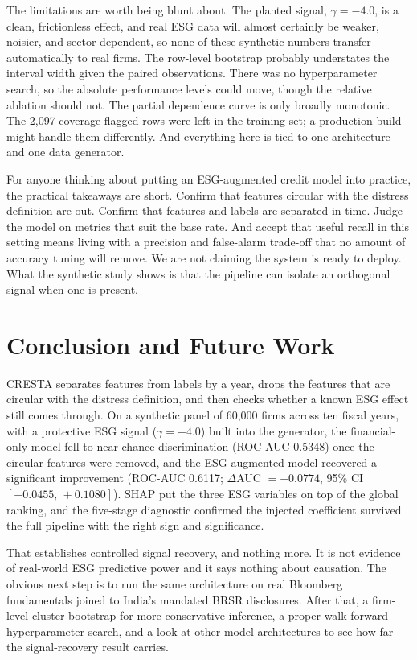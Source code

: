 \documentclass[conference]{IEEEtran}
\begin{document}
The limitations are worth being blunt about. The planted signal, $\gamma = -4.0$,
is a clean, frictionless effect, and real ESG data will almost certainly be
weaker, noisier, and sector-dependent, so none of these synthetic numbers
transfer automatically to real firms. The row-level bootstrap probably
understates the interval width given the paired observations. There was no
hyperparameter search, so the absolute performance levels could move, though the
relative ablation should not. The partial dependence curve is only broadly
monotonic. The 2{,}097 coverage-flagged rows were left in the training set; a
production build might handle them differently. And everything here is tied to
one architecture and one data generator.

For anyone thinking about putting an ESG-augmented credit model into practice,
the practical takeaways are short. Confirm that features circular with the
distress definition are out. Confirm that features and labels are separated in
time. Judge the model on metrics that suit the base rate. And accept that useful
recall in this setting means living with a precision and false-alarm trade-off
that no amount of accuracy tuning will remove. We are not claiming the system is
ready to deploy. What the synthetic study shows is that the pipeline can isolate
an orthogonal signal when one is present.

\section{Conclusion and Future Work}

CRESTA separates features from labels by a year, drops the features that are
circular with the distress definition, and then checks whether a known ESG effect
still comes through. On a synthetic panel of 60{,}000 firms across ten fiscal
years, with a protective ESG signal ($\gamma = -4.0$) built into the generator,
the financial-only model fell to near-chance discrimination (ROC-AUC 0.5348) once
the circular features were removed, and the ESG-augmented model recovered a
significant improvement (ROC-AUC 0.6117; $\Delta$AUC $= +0.0774$, 95\% CI
$[+0.0455,\, +0.1080]$). SHAP put the three ESG variables on top of the global
ranking, and the five-stage diagnostic confirmed the injected coefficient
survived the full pipeline with the right sign and significance.

That establishes controlled signal recovery, and nothing more. It is not
evidence of real-world ESG predictive power and it says nothing about causation.
The obvious next step is to run the same architecture on real Bloomberg
fundamentals joined to India's mandated BRSR disclosures. After that, a
firm-level cluster bootstrap for more conservative inference, a proper
walk-forward hyperparameter search, and a look at other model architectures to
see how far the signal-recovery result carries.
\end{document}
